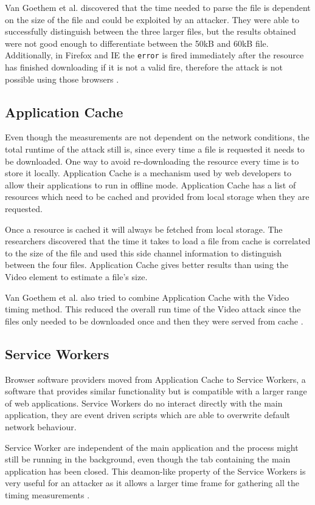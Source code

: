 \documentclass[10pt,a4paper,twoside]{book}
\begin{document}
Van Goethem et al. discovered that the time needed to parse the file is dependent on the size of the file and could be exploited by an attacker. They were able to successfully distinguish between the three larger files, but the results obtained were not good enough to differentiate between the 50kB and 60kB file. Additionally, in Firefox and IE the \texttt{error} is fired immediately after the resource has finished downloading if it is not a valid fire, therefore the attack is not possible using those browsers \cite{van2015clock}.

\subsection{Application Cache}
Even though the measurements are not dependent on the network conditions, the total runtime of the attack still is, since every time a file is requested it needs to be downloaded. One way to avoid re-downloading the resource every time is to store it locally. Application Cache is a mechanism used by web developers to allow their applications to run in offline mode. Application Cache has a list of resources which need to be cached and provided from local storage when they are requested. 

Once a resource is cached it will always be fetched from local storage. The researchers discovered that the time it takes to load a file from cache is correlated to the size of the file and used this side channel information to distinguish between the four files. Application Cache gives better results than using the Video element to estimate a file's size.

Van Goethem et al. also tried to combine Application Cache with the Video timing method. This reduced the overall run time of the Video attack since the files only needed to be downloaded once and then they were served from cache \cite{van2015clock}.

\subsection{Service Workers}
Browser software providers moved from Application Cache to Service Workers, a software that provides similar functionality but is compatible with a larger range of web applications. Service Workers do no interact directly with the main application, they are event driven scripts which are able to overwrite default network behaviour. 

Service Worker are independent of the main application and the process might still be running in the background, even though the tab containing the main application has been closed. This deamon-like property of the Service Workers is very useful for an attacker as it allows a larger time frame for gathering all the timing measurements \cite{van2015clock}.
\end{document}
